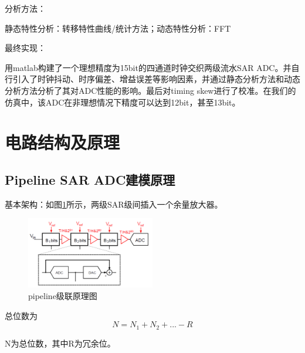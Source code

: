 \documentclass[cs4size,a4paper]{ctexart}
\numberwithin{equation}{section}
\numberwithin{table}{section}
\numberwithin{figure}{section}
\begin{document}
\noindent
分析方法：

静态特性分析：转移特性曲线/统计方法；动态特性分析：FFT

\noindent
最终实现：

用matlab构建了一个理想精度为15bit的四通道时钟交织两级流水SAR ADC。并自行引入了时钟抖动、时序偏差、增益误差等影响因素，并通过静态分析方法和动态分析方法分析了其对ADC性能的影响。最后对timing skew进行了校准。在我们的仿真中，该ADC在非理想情况下精度可以达到12bit，甚至13bit。

\newpage
\section{电路结构及原理}

    \subsection{Pipeline SAR ADC建模原理}
        基本架构：如图\ref{fig:circuit1}所示，两级SAR级间插入一个余量放大器。
        	\begin{figure}[H]
        		\centering
        		\includegraphics[width=0.5\textwidth]{figure/circuit1.jpg}
        		\caption{pipeline级联原理图} \label{fig:circuit1}
        	\end{figure}
        	
        总位数为
            \begin{equation}
                N=N_1+N_2+...-R
            \end{equation}
            
        N为总位数，其中R为冗余位。
        
\end{document}
